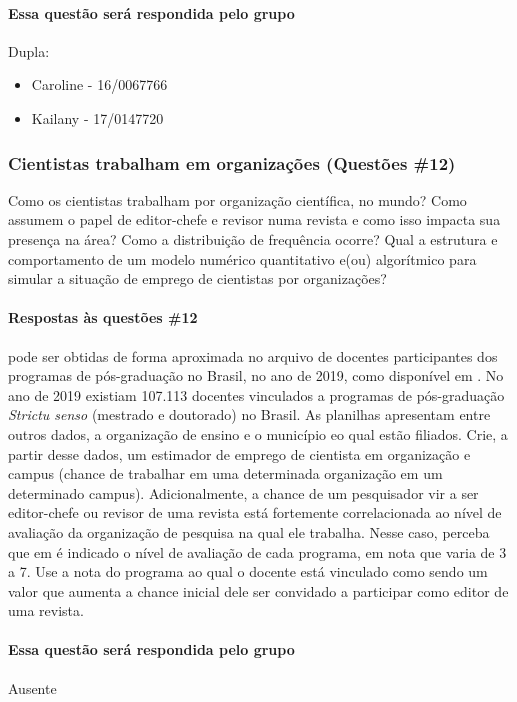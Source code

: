 \paragraph{Essa questão será respondida pelo grupo} 
Dupla:
\begin{itemize}
    \item Caroline - 16/0067766
    \item Kailany - 17/0147720
\end{itemize}

\subsubsection{Cientistas trabalham em organizações (Questões \#12)}
Como os cientistas trabalham por organização científica, no mundo? Como assumem o papel de editor-chefe e revisor numa revista e como isso impacta sua presença na área? Como a distribuição de frequência ocorre? Qual a estrutura e comportamento de um modelo numérico quantitativo e(ou) algorítmico para simular a situação de emprego de cientistas por organizações?

\paragraph{Respostas às questões \#12} pode ser obtidas de forma aproximada no arquivo de docentes participantes dos programas de pós-graduação no Brasil, no ano de 2019, como disponível em \cite{capes_docentes_2020}. No ano de 2019 existiam 107.113 docentes vinculados a programas de pós-graduação \textit{Strictu senso} (mestrado e doutorado) no Brasil. As planilhas apresentam entre outros dados, a organização de ensino e o município eo qual estão filiados.
Crie, a partir desse dados, um estimador de emprego de cientista em organização e campus (chance de trabalhar em uma determinada organização em um determinado campus).
Adicionalmente, a chance de um pesquisador vir a ser editor-chefe ou revisor de uma revista está fortemente correlacionada ao nível de avaliação da organização de pesquisa na qual ele trabalha. Nesse caso, perceba que em \cite{capes_programas_2021} é indicado o nível de avaliação de cada programa, em nota que varia de 3 a 7. Use a nota do programa ao qual o docente está vinculado como sendo um valor que aumenta a chance inicial dele ser convidado a participar como editor de uma revista.

\paragraph{Essa questão será respondida pelo grupo}
Ausente

